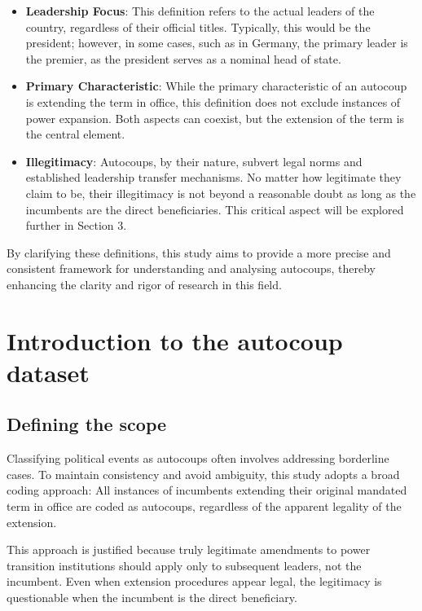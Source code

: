 \documentclass[
  12pt,
]{report}
\begin{document}
\begin{itemize}
\item
  \textbf{Leadership Focus}: This definition refers to the actual
  leaders of the country, regardless of their official titles.
  Typically, this would be the president; however, in some cases, such
  as in Germany, the primary leader is the premier, as the president
  serves as a nominal head of state.
\item
  \textbf{Primary Characteristic}: While the primary characteristic of
  an autocoup is extending the term in office, this definition does not
  exclude instances of power expansion. Both aspects can coexist, but
  the extension of the term is the central element.
\item
  \textbf{Illegitimacy}: Autocoups, by their nature, subvert legal norms
  and established leadership transfer mechanisms. No matter how
  legitimate they claim to be, their illegitimacy is not beyond a
  reasonable doubt as long as the incumbents are the direct
  beneficiaries. This critical aspect will be explored further in
  Section 3.
\end{itemize}

By clarifying these definitions, this study aims to provide a more
precise and consistent framework for understanding and analysing
autocoups, thereby enhancing the clarity and rigor of research in this
field.

\section{Introduction to the autocoup
dataset}\label{introduction-to-the-autocoup-dataset}

\subsection{Defining the scope}\label{defining-the-scope}

Classifying political events as autocoups often involves addressing
borderline cases. To maintain consistency and avoid ambiguity, this
study adopts a broad coding approach: All instances of incumbents
extending their original mandated term in office are coded as autocoups,
regardless of the apparent legality of the extension.

This approach is justified because truly legitimate amendments to power
transition institutions should apply only to subsequent leaders, not the
incumbent. Even when extension procedures appear legal, the legitimacy
is questionable when the incumbent is the direct beneficiary.
\end{document}
